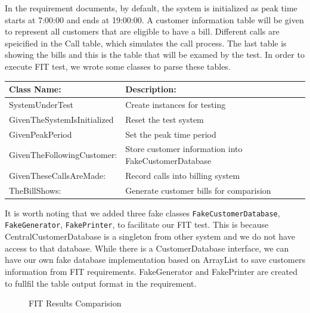 \documentclass[a4paper,12pt,oneside,final]{article}
\begin{document}
In the requirement documents, by default, the system is initialized as peak time starts at 7:00:00 and ends at 19:00:00. A customer information table will be given to represent all customers that are eligible to have a bill. Different calls are speicified in the Call table, which simulates the call process. The last table is showing the bills and this is the table that will be examed by the test. In order to execute FIT test, we wrote some classes to parse these tables. 
\begin{center}
    \begin{tabular}{ | l | p{8cm} |}
    \hline
    Class Name: &  Description: \\  \hline
    SystemUnderTest  & Create instances for testing \\  \hline
    GivenTheSystemIsInitialized & Reset the test system \\  \hline
    GivenPeakPeriod  & Set the peak time period \\  \hline
    GivenTheFollowingCustomer: & Store customer information into FakeCustomerDatabase\\  \hline
    GivenTheseCallsAreMade: & Record calls into billing system \\  \hline
   TheBillShows: & Generate customer bills for comparision \\
   \hline
    \end{tabular}
\end{center}

It is worth noting that we added three fake classes  \verb+FakeCustomerDatabase+, \verb+FakeGenerator+, \verb+FakePrinter+, to facilitate our FIT test. This is because CentralCustomerDatabase is a singleton from other system and we do not have access to that database. While there is a CustomerDatabase interface, we can have our own fake database implementation based on ArrayList to save customers information from FIT requirements. FakeGenerator and FakePrinter are created to fullfil the table output format in the requirement. 

\begin{figure}
\centering
\mbox{}
\caption{FIT Results Comparision}
\end{figure}
\end{document}
